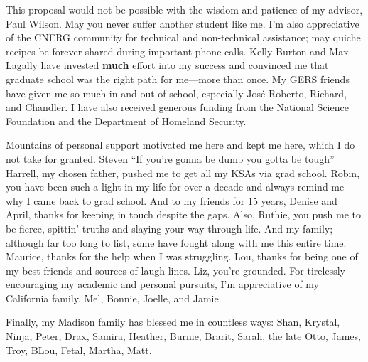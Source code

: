 \footnotesize{
This proposal would not be possible with the wisdom and patience of my advisor,
Paul Wilson. May you never suffer another student like me.  I'm also
appreciative of the CNERG community for technical and non-technical assistance;
may quiche recipes be forever shared during important phone calls.  Kelly
Burton and Max Lagally have invested \textbf{much} effort into my success and
convinced me that graduate school was the right path for me---more than once.
My GERS friends have given me so much in and out of school, especially Jos\'e
Roberto, Richard, and Chandler.  I have also received generous funding from the
National Science Foundation and the Department of Homeland Security.

Mountains of personal support motivated me here and kept me here, which I do
not take for granted. Steven ``If you're gonna be dumb you gotta be tough''
Harrell, my chosen father, pushed me to get all my KSAs via grad school.
Robin, you have been such a light in my life for over a decade and always
remind me why I came back to grad school.  And to my friends for 15 years,
Denise and April, thanks for keeping in touch despite the gaps.  Also, Ruthie,
you push me to be fierce, spittin' truths and slaying your way through life.
And my family; although far too long to list, some have fought along with me
this entire time.  Maurice, thanks for the help when I was struggling.  Lou,
thanks for being one of my best friends and sources of laugh lines. Liz, you're
grounded.  For tirelessly encouraging my academic and personal pursuits, I'm
appreciative of my California family, Mel, Bonnie, Joelle, and Jamie. 

Finally, my Madison family has blessed me in countless ways: Shan, Krystal,
Ninja, Peter, Drax, Samira, Heather, Burnie, Brarit, Sarah, the late Otto,
James, Troy, BLou, Fetal, Martha, Matt.
}

